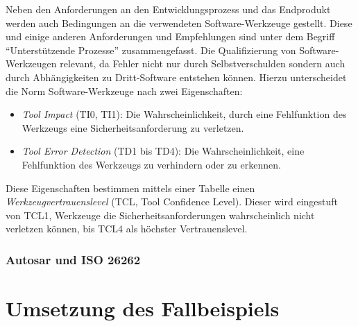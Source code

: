 \documentclass[
  a4paper,					    %
  twoside,
  DIV=calc,     				%
  bibliography=totoc,
  cleardoublepage=empty,
  ngerman,     					%
  final       					%
]{scrbook}
\begin{document}
Neben den Anforderungen an den Entwicklungsprozess und das Endprodukt werden auch Bedingungen an die verwendeten Software-Werkzeuge gestellt. Diese und einige anderen Anforderungen und Empfehlungen sind unter dem Begriff "`Unterstützende Prozesse"' zusammengefasst. Die Qualifizierung von Software-Werkzeugen relevant, da Fehler nicht nur durch Selbstverschulden sondern auch durch Abhängigkeiten zu Dritt-Software entstehen können. Hierzu unterscheidet die Norm Software-Werkzeuge nach zwei Eigenschaften:

\begin{itemize}
    \item \emph{Tool Impact} (TI0, TI1): Die Wahrscheinlichkeit, durch eine Fehlfunktion des Werkzeugs eine Sicherheitsanforderung zu verletzen.
    \item \emph{Tool Error Detection} (TD1 bis TD4): Die Wahrscheinlichkeit, eine Fehlfunktion des Werkzeugs zu verhindern oder zu erkennen.
\end{itemize}

Diese Eigenschaften bestimmen mittels einer Tabelle einen \emph{Werkzeugvertrauenslevel} (TCL, Tool Confidence Level). Dieser wird eingestuft von TCL1, Werkzeuge die Sicherheitsanforderungen wahrscheinlich nicht verletzen können, bis TCL4 als höchster Vertrauenslevel.



\subsection{Autosar und ISO 26262}
\label{sec:ISO26262_autosar}












\chapter{Umsetzung des Fallbeispiels}
\label{sec:Umsetzung_Fallbeispiel}
\end{document}
